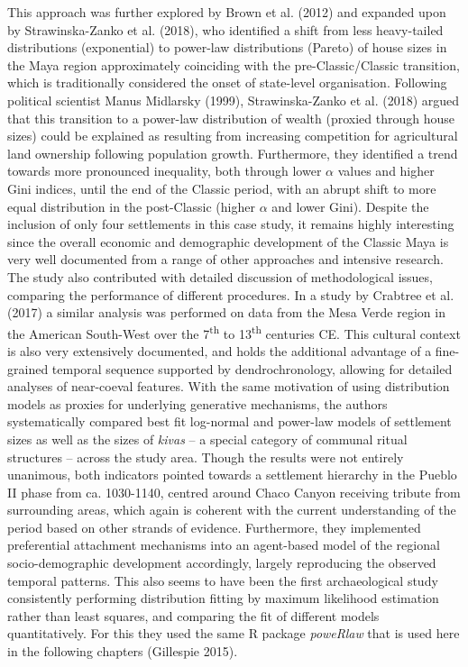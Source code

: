 \documentclass[
  12pt,
]{book}
\begin{document}
This approach was further explored by Brown et al. (2012) and expanded upon by Strawinska-Zanko et al. (2018), who identified a shift from less heavy-tailed distributions (exponential) to power-law distributions (Pareto) of house sizes in the Maya region approximately coinciding with the pre-Classic/Classic transition, which is traditionally considered the onset of state-level organisation. Following political scientist Manus Midlarsky (1999), Strawinska-Zanko et al. (2018) argued that this transition to a power-law distribution of wealth (proxied through house sizes) could be explained as resulting from increasing competition for agricultural land ownership following population growth. Furthermore, they identified a trend towards more pronounced inequality, both through lower \(\alpha\) values and higher Gini indices, until the end of the Classic period, with an abrupt shift to more equal distribution in the post-Classic (higher \(\alpha\) and lower Gini). Despite the inclusion of only four settlements in this case study, it remains highly interesting since the overall economic and demographic development of the Classic Maya is very well documented from a range of other approaches and intensive research. The study also contributed with detailed discussion of methodological issues, comparing the performance of different procedures. In a study by Crabtree et al. (2017) a similar analysis was performed on data from the Mesa Verde region in the American South-West over the 7\textsuperscript{th} to 13\textsuperscript{th} centuries CE. This cultural context is also very extensively documented, and holds the additional advantage of a fine-grained temporal sequence supported by dendrochronology, allowing for detailed analyses of near-coeval features. With the same motivation of using distribution models as proxies for underlying generative mechanisms, the authors systematically compared best fit log-normal and power-law models of settlement sizes as well as the sizes of \emph{kivas} -- a special category of communal ritual structures -- across the study area. Though the results were not entirely unanimous, both indicators pointed towards a settlement hierarchy in the Pueblo II phase from ca. 1030-1140, centred around Chaco Canyon receiving tribute from surrounding areas, which again is coherent with the current understanding of the period based on other strands of evidence. Furthermore, they implemented preferential attachment mechanisms into an agent-based model of the regional socio-demographic development accordingly, largely reproducing the observed temporal patterns. This also seems to have been the first archaeological study consistently performing distribution fitting by maximum likelihood estimation rather than least squares, and comparing the fit of different models quantitatively. For this they used the same R package \emph{poweRlaw} that is used here in the following chapters (Gillespie 2015).
\end{document}
